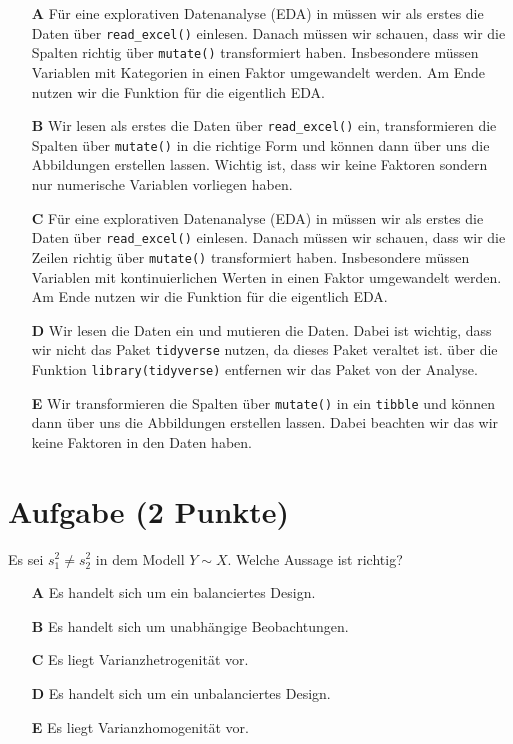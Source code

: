 \documentclass[a4paper, 9pt]{scrartcl}\usepackage[]{graphicx}\usepackage[]{xcolor}
\begin{document}
\begin{enumerate}
\item [\textbf{A} \msquare] Für eine explorativen Datenanalyse (EDA) in \Rlogo müssen wir als erstes die Daten über \texttt{read\_excel()} einlesen. Danach müssen wir schauen, dass wir die Spalten richtig über \texttt{mutate()} transformiert haben. Insbesondere müssen Variablen mit Kategorien in einen Faktor umgewandelt werden. Am Ende nutzen wir die Funktion  für die eigentlich EDA.
\item [\textbf{B} \msquare] Wir lesen als erstes die Daten über \texttt{read\_excel()} ein, transformieren die Spalten über \texttt{mutate()} in die richtige Form und können dann  über  uns die Abbildungen erstellen lassen. Wichtig ist, dass wir keine Faktoren sondern nur numerische Variablen vorliegen haben.
\item [\textbf{C} \msquare] Für eine explorativen Datenanalyse (EDA) in \Rlogo müssen wir als erstes die Daten über \texttt{read\_excel()} einlesen. Danach müssen wir schauen, dass wir die Zeilen richtig über \texttt{mutate()} transformiert haben. Insbesondere müssen Variablen mit kontinuierlichen Werten in einen Faktor umgewandelt werden. Am Ende nutzen wir die Funktion  für die eigentlich EDA.
\item [\textbf{D} \msquare] Wir lesen die Daten ein und mutieren die Daten. Dabei ist wichtig, dass wir nicht das Paket \texttt{tidyverse} nutzen, da dieses Paket veraltet ist. über die Funktion \texttt{library(tidyverse)} entfernen wir das Paket von der Analyse.
\item [\textbf{E} \msquare] Wir transformieren die Spalten über \texttt{mutate()} in ein \texttt{tibble} und können dann über  uns die Abbildungen erstellen lassen. Dabei beachten wir das wir keine Faktoren in den Daten haben.
\end{enumerate}

\section{Aufgabe \hfill (2 Punkte)}



Es sei $s^2_1 \neq s^2_2$ in dem Modell $Y \sim X$. Welche Aussage ist richtig?



\begin{enumerate}
\item [\textbf{A} \msquare] Es handelt sich um ein balanciertes Design.
\item [\textbf{B} \msquare] Es handelt sich um unabhängige Beobachtungen.
\item [\textbf{C} \msquare] Es liegt Varianzhetrogenität vor.
\item [\textbf{D} \msquare] Es handelt sich um ein unbalanciertes Design.
\item [\textbf{E} \msquare] Es liegt Varianzhomogenität vor.
\end{enumerate}
\end{document}
